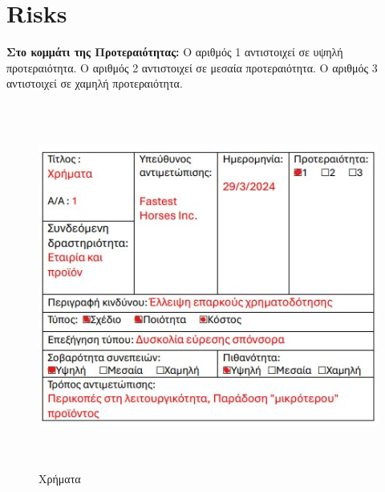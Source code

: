 \section{Risks}

\textbf{ Στο κομμάτι της Προτεραιότητας:} \newline
Ο αριθμός 1 αντιστοιχεί σε υψηλή προτεραιότητα. \newline
Ο αριθμός 2 αντιστοιχεί σε μεσαία προτεραιότητα. \newline
Ο αριθμός 3 αντιστοιχεί σε χαμηλή προτεραιότητα. \newline
\begin{figure}[!htb]
  \centering
    \centering
    \includegraphics[width=\textwidth,height=12cm]{risk1.jpg}
    \caption{Χρήματα}
    \label{}
\end{figure}
